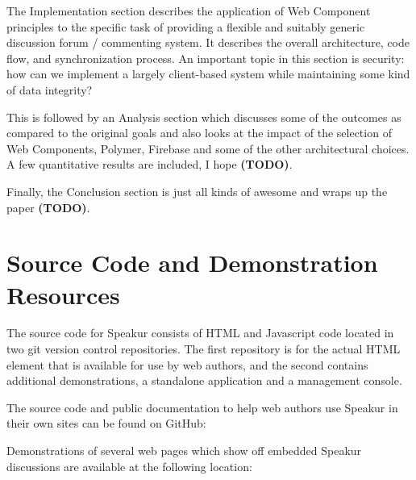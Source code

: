 The Implementation section describes the application of Web Component principles to the specific task of providing a flexible and suitably generic discussion forum / commenting system. 
It describes the overall architecture, code flow, and synchronization process. 
An important topic in this section is security: how can we implement a largely client-based system while maintaining some kind of data integrity?

This is followed by an Analysis section which discusses some of the outcomes as compared to the original goals and also looks at the impact of the selection of Web Components, Polymer, Firebase and some of the other architectural choices. 
A few quantitative results are included, I hope \textbf{(TODO)}.

Finally, the Conclusion section is just all kinds of awesome and wraps up the paper \textbf{(TODO)}. 

\section{Source Code and Demonstration Resources}
%

The source code for Speakur consists of HTML and Javascript code located in two git version control repositories. The first repository is for the actual
HTML element that is available for use by web authors, and the second contains additional demonstrations, a standalone application and a management console.

The source code and public documentation to help web authors use Speakur in their own sites can be found on GitHub:


Demonstrations of several web pages which show off embedded Speakur discussions are available at the following location:

